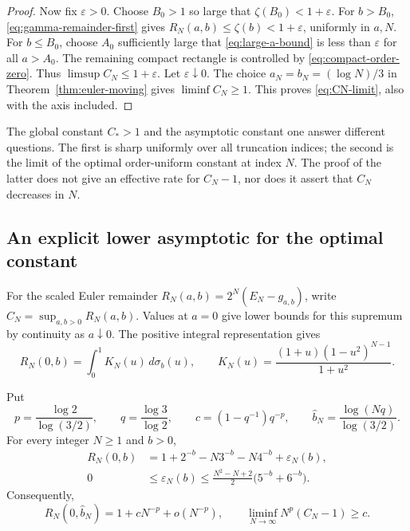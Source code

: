 \begin{proof}
Now fix $\varepsilon>0$. Choose $B_0>1$ so large that
$\zeta(B_0)<1+\varepsilon$. For $b>B_0$,
\eqref{eq:gamma-remainder-first} gives
$R_N(a,b)\leq\zeta(b)<1+\varepsilon$, uniformly in $a,N$.
For $b\leq B_0$, choose $A_0$ sufficiently large that
\eqref{eq:large-a-bound} is less than $\varepsilon$
for all $a>A_0$. The remaining compact rectangle is
controlled by \eqref{eq:compact-order-zero}. Thus
$\limsup C_N\leq1+\varepsilon$. Let $\varepsilon\downarrow0$.
The choice $a_N=b_N=(\log N)/3$ in
Theorem~\ref{thm:euler-moving} gives $\liminf C_N\geq1$.
This proves \eqref{eq:CN-limit}, also with the axis included.
\end{proof}

The global constant $C_*>1$ and the asymptotic constant one
answer different questions. The first is sharp uniformly
over all truncation indices; the second is the limit of
the optimal order-uniform constant at index $N$.
The proof of the latter does not give an effective rate for
$C_N-1$, nor does it assert that $C_N$ decreases in $N$.

\subsection{An explicit lower asymptotic for the optimal constant}
\label{sec:axis-asymptotic-budget}

For the scaled Euler remainder $R_N(a,b)=2^N(E_N-g_{a,b})$, write
$C_N=\sup_{a,b>0}R_N(a,b)$. Values at $a=0$ give lower bounds for
this supremum by continuity as $a\downarrow0$. The positive integral
representation gives
\[
 R_N(0,b)=\int_0^1 K_N(u)\,d\sigma_b(u),\qquad
 K_N(u)=\frac{(1+u)(1-u^2)^{N-1}}{1+u^2}.
\]

\begin{proposition}
\label{prop:euler-axis-lower}
Put
\[
 p=\frac{\log2}{\log(3/2)},\qquad
 q=\frac{\log3}{\log2},\qquad
 c=(1-q^{-1})q^{-p},\qquad
 \widehat b_N=\frac{\log(Nq)}{\log(3/2)}.
\]
For every integer $N\ge1$ and $b>0$,
\begin{align*}
 R_N(0,b)&=1+2^{-b}-N3^{-b}-N4^{-b}+\varepsilon_N(b),\\
 0&\le\varepsilon_N(b)\le
       \frac{N^2-N+2}{2}\bigl(5^{-b}+6^{-b}\bigr).
\end{align*}
Consequently,
\[
 R_N(0,\widehat b_N)=1+cN^{-p}+o(N^{-p}),\qquad
 \liminf_{N\to\infty}N^p(C_N-1)\ge c.
\]
\end{proposition}

